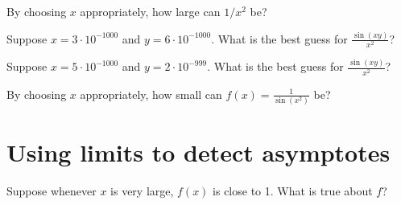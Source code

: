 \documentclass{ximera}
\begin{document}
\begin{problem}
  By choosing $x$ appropriately, how large can $1/x^2$ be?
  \begin{multipleChoice}
  \end{multipleChoice}
\end{problem}

\begin{problem}
  Suppose $x = 3 \cdot 10^{-1000}$ and $y = 6 \cdot 10^{-1000}$.  What is the best guess for $\frac{\sin (xy)}{x^2}$?
  \begin{multipleChoice}
  \end{multipleChoice}
\end{problem}

\begin{problem}
  Suppose $x = 5 \cdot 10^{-1000}$ and $y = 2 \cdot 10^{-999}$.  What is the best guess for $\frac{\sin (xy)}{x^2}$?
  \begin{multipleChoice}
  \end{multipleChoice}
\end{problem}

\begin{problem}
  By choosing $x$ appropriately, how small can $f(x) = \frac{1}{\sin (x^2)}$ be?
  \begin{multipleChoice}
  \end{multipleChoice}
\end{problem}

\clearpage

\section{Using limits to detect asymptotes}

\begin{problem}
  Suppose whenever $x$ is very large, $f(x)$ is close to 1.  What is true about $f$?
  \begin{multipleChoice}
  \end{multipleChoice}
\end{problem}
\end{document}
